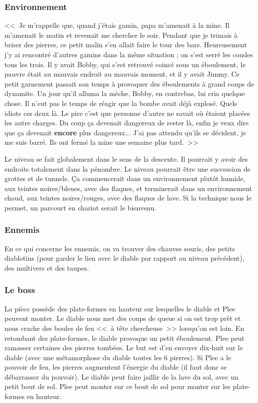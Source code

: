 \documentclass{article}
\begin{document}
\subsubsection{Environnement}
<<~Je m'rappelle que, quand j'étais gamin, papa m'amenait à la
mine. Il m'amenait le matin et revenait me chercher le soir. Pendant
que je trimais à briser des pierres, ce petit malin s'en allait faire
le tour des bars. Heureusement j'y ai rencontré d'autres gamins dans
la même situation ; on s'est serré les coudes tous les trois. Il y
avait Bobby, qui s'est retrouvé coincé sous un éboulement, le pauvre
était au mauvais endroit au mauvais moment, et il y avait Jimmy. Ce
petit garnement passait son temps à provoquer des éboulements à grand
coups de dynamite. Un jour qu'il alluma la mèche, Bobby, en contrebas,
lui cria quelque chose. Il n'eut pas le temps de réagir que la bombe
avait déjà explosé. Quels idiots ces deux là. Le pire c'est que
personne d'autre ne savait o\`u étaient placées les autre charges. Du
coup ça devenait dangereux de rester là, enfin je veux dire que ça
devenait \textbf{encore} plus dangereux... J'ai pas attendu qu'ils se
décident, je me suis barré. Ils ont fermé la mine une semaine plus
tard.~>>

Le niveau se fait globalement dans le sens de la descente. Il pourrait
y avoir des endroits totalement dans la pénombre. Le niveau pourrait
être une succession de grottes et de tunnels. Ça commencerait dans un
environnement plutôt humide, aux teintes noires/bleues, avec des
flaques, et terminerait dans un environnement chaud, aux teintes
noires/rouges, avec des flaques de lave. Si la technique nous le
permet, un parcourt en chariot serait le bienvenu.

\subsubsection{Ennemis}
En ce qui concerne les ennemis, on va trouver des chauves souris, des
petits diablotins (pour garder le lien avec le diable par rapport au
niveau précédent), des multivers et des taupes.

\subsubsection{Le boss}
La pièce possède des plate-formes en hauteur sur lesquelles le diable
et Plee peuvent monter.  Le diable nous met des coups de queue si on
est trop prêt et nous crache des boules de feu <<~à tête chercheuse~>>
lorsqu'on est loin.  En retombant des plate-formes, le diable provoque
un petit éboulement. Plee peut ramasser certaines des pierres
tombées. Le but est d'en envoyer dix-huit sur le diable (avec une
métamorphose du diable toutes les 6 pierres). Si Plee a le pouvoir de
feu, les pierres augmentent l'énergie du diable (il faut donc se
débarrasser du pouvoir). Le diable peut faire jaillir de la lave du
sol, avec un petit bout de sol. Plee peut monter sur ce bout de sol
pour monter sur les plate-formes en hauteur.
\end{document}

